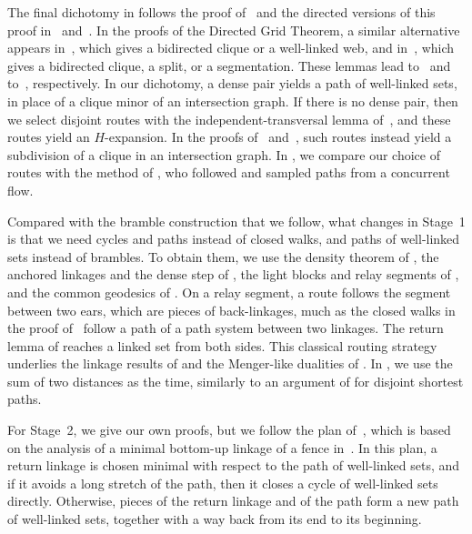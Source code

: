 \documentclass[fontsize=12pt,leading=14pt]{fullpaper}
\newcounter{step}
\begin{document}
The final dichotomy in  follows the proof of~\cite[Theorem~1.2]{RW12} and the directed versions of this proof in~\cite[lemmas~3.1 and~3.3]{MPRS22} and~\cite[Lemma~5.3]{CLNS26}.
In the proofs of the Directed Grid Theorem, a similar alternative appears in~\cite[Lemma~4.8]{KawarabayashiK15}, which gives a bidirected clique or a well-linked web, and in~\cite[Lemma~5.13]{HKMM26a}, which gives a bidirected clique, a split, or a segmentation.
These lemmas lead to~\cite[Theorem~4.2]{KawarabayashiK15} and to~\cite[Theorem~5.14]{HKMM26a}, respectively.
In our dichotomy, a dense pair yields a path of well-linked sets, in place of a clique minor of an intersection graph.
If there is no dense pair, then we select disjoint routes with the independent-transversal lemma of~\cite[Lemma~4.2]{RW12}, and these routes yield an $H$-expansion.
In the proofs of~\cite[Theorem~1.2]{RW12} and~\cite[Lemma~5.3]{CLNS26}, such routes instead yield a subdivision of a clique in an intersection graph.
In , we compare our choice of routes with the method of \textcite[Section~4]{HKPS22}, who followed \textcite{GroheM09} and sampled paths from a concurrent flow.

Compared with the bramble construction that we follow, what changes in Stage~1 is that we need cycles and paths instead of closed walks, and paths of well-linked sets instead of brambles.
To obtain them, we use the density theorem of , the anchored linkages and the dense step of , the light blocks and relay segments of , and the common geodesics of .
On a relay segment, a route follows the segment between two ears, which are pieces of back-linkages, much as the closed walks in the proof of~\cite[Lemma~3.2]{MPRS22} follow a path of a path system between two linkages.
The return lemma of  reaches a linked set from both sides.
This classical routing strategy underlies the linkage results of \textcite{EMW17} and the Menger-like dualities of \textcite{CCLS25}.
In , we use the sum of two distances as the time, similarly to an argument of \textcite[Lemma~7]{BercziK17} for disjoint shortest paths.

For Stage~2, we give our own proofs, but we follow the plan of~\cite[sections~4 and~5]{HKMM26b}, which is based on the analysis of a minimal bottom-up linkage of a fence in~\cite[Section~6]{KawarabayashiK15}.
In this plan, a return linkage is chosen minimal with respect to the path of well-linked sets, and if it avoids a long stretch of the path, then it closes a cycle of well-linked sets directly.
Otherwise, pieces of the return linkage and of the path form a new path of well-linked sets, together with a way back from its end to its beginning.
\end{document}
